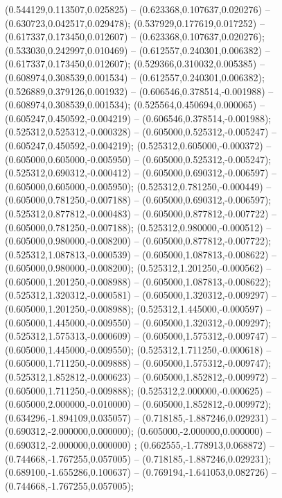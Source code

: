  (0.544129,0.113507,0.025825) -- (0.623368,0.107637,0.020276) -- (0.630723,0.042517,0.029478);
 (0.537929,0.177619,0.017252) -- (0.617337,0.173450,0.012607) -- (0.623368,0.107637,0.020276);
 (0.533030,0.242997,0.010469) -- (0.612557,0.240301,0.006382) -- (0.617337,0.173450,0.012607);
 (0.529366,0.310032,0.005385) -- (0.608974,0.308539,0.001534) -- (0.612557,0.240301,0.006382);
 (0.526889,0.379126,0.001932) -- (0.606546,0.378514,-0.001988) -- (0.608974,0.308539,0.001534);
 (0.525564,0.450694,0.000065) -- (0.605247,0.450592,-0.004219) -- (0.606546,0.378514,-0.001988);
 (0.525312,0.525312,-0.000328) -- (0.605000,0.525312,-0.005247) -- (0.605247,0.450592,-0.004219);
 (0.525312,0.605000,-0.000372) -- (0.605000,0.605000,-0.005950) -- (0.605000,0.525312,-0.005247);
 (0.525312,0.690312,-0.000412) -- (0.605000,0.690312,-0.006597) -- (0.605000,0.605000,-0.005950);
 (0.525312,0.781250,-0.000449) -- (0.605000,0.781250,-0.007188) -- (0.605000,0.690312,-0.006597);
 (0.525312,0.877812,-0.000483) -- (0.605000,0.877812,-0.007722) -- (0.605000,0.781250,-0.007188);
 (0.525312,0.980000,-0.000512) -- (0.605000,0.980000,-0.008200) -- (0.605000,0.877812,-0.007722);
 (0.525312,1.087813,-0.000539) -- (0.605000,1.087813,-0.008622) -- (0.605000,0.980000,-0.008200);
 (0.525312,1.201250,-0.000562) -- (0.605000,1.201250,-0.008988) -- (0.605000,1.087813,-0.008622);
 (0.525312,1.320312,-0.000581) -- (0.605000,1.320312,-0.009297) -- (0.605000,1.201250,-0.008988);
 (0.525312,1.445000,-0.000597) -- (0.605000,1.445000,-0.009550) -- (0.605000,1.320312,-0.009297);
 (0.525312,1.575313,-0.000609) -- (0.605000,1.575312,-0.009747) -- (0.605000,1.445000,-0.009550);
 (0.525312,1.711250,-0.000618) -- (0.605000,1.711250,-0.009888) -- (0.605000,1.575312,-0.009747);
 (0.525312,1.852812,-0.000623) -- (0.605000,1.852812,-0.009972) -- (0.605000,1.711250,-0.009888);
 (0.525312,2.000000,-0.000625) -- (0.605000,2.000000,-0.010000) -- (0.605000,1.852812,-0.009972);
 (0.634296,-1.894109,0.035057) -- (0.718185,-1.887246,0.029231) -- (0.690312,-2.000000,0.000000);
 (0.605000,-2.000000,0.000000) -- (0.690312,-2.000000,0.000000) ;
 (0.662555,-1.778913,0.068872) -- (0.744668,-1.767255,0.057005) -- (0.718185,-1.887246,0.029231);
 (0.689100,-1.655286,0.100637) -- (0.769194,-1.641053,0.082726) -- (0.744668,-1.767255,0.057005);
